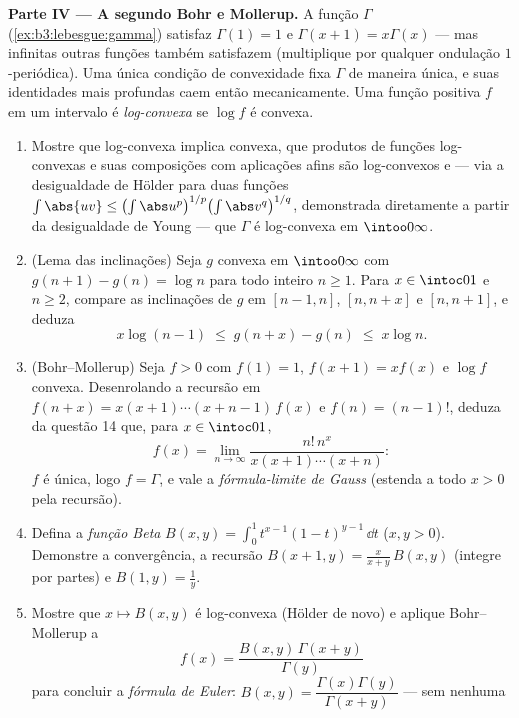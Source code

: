 \begin{problem}
\medskip
\noindent\textbf{Parte IV --- A  segundo Bohr e Mollerup.} A
função $\Gamma$ (\cref{ex:b3:lebesgue:gamma}) satisfaz $\Gamma(1) = 1$ e $\Gamma(x+1) = x\Gamma(x)$ --- mas
infinitas outras funções também satisfazem (multiplique por qualquer
ondulação $1$-periódica). Uma única condição de convexidade fixa
$\Gamma$ de maneira única, e suas identidades mais profundas caem
então mecanicamente. Uma função positiva $f$ em um intervalo é
\emph{log-convexa} se $\log f$ é convexa.
\begin{enumerate}[resume]
  \item Mostre que log-convexa implica convexa, que produtos de funções
        log-convexas e suas composições com aplicações afins são
        log-convexos e --- via a desigualdade de Hölder para duas
        funções $\int\abs{uv} \leq
        \bigl(\int\abs u^p\bigr)^{1/p}\bigl(\int\abs
        v^q\bigr)^{1/q}$, demonstrada diretamente a partir da desigualdade
        de Young --- que $\Gamma$ é log-convexa em $\intoo0\infty$.
  \item (Lema das inclinações) Seja $g$ convexa em $\intoo0\infty$ com $g(n+1) - g(n) = \log n$
        para todo inteiro $n
        \geq 1$. Para $x \in \intoc01$ e $n \geq 2$, compare as
        inclinações de $g$ em $[n-1, n]$, $[n, n+x]$ e $[n, n+1]$, e deduza
        \[
        x\log(n-1) \;\leq\; g(n + x) - g(n) \;\leq\; x\log n .
        \]
  \item (Bohr--Mollerup) Seja $f > 0$ com $f(1) = 1$, $f(x+1) = xf(x)$ e $\log f$
        convexa. Desenrolando a recursão em $f(n + x) = x(x+1)\cdots(x + n -
        1)\,f(x)$ e $f(n) = (n-1)!$, deduza da
        questão 14 que, para $x \in \intoc01$,
        \[
        f(x) = \lim_{n\to\infty}
        \frac{n!\,n^x}{x(x+1)\cdots(x+n)} :
        \]
        $f$ é única, logo $f = \Gamma$, e vale a \emph{fórmula-limite de
        Gauss} (estenda a todo $x > 0$ pela recursão).
  \item Defina a \emph{função Beta} $B(x, y) =
        \int_0^1t^{x-1}(1-t)^{y-1}\,\dd t$ ($x, y > 0$). Demonstre a
        convergência, a recursão $B(x+1, y) =
        \frac{x}{x+y}\,B(x, y)$ (integre por partes) e $B(1, y) = \frac1y$.
  \item Mostre que $x \mapsto B(x, y)$ é log-convexa (Hölder de novo) e aplique
        Bohr--Mollerup a
        \[
        f(x) = \frac{B(x, y)\,\Gamma(x + y)}{\Gamma(y)}
        \]
        para concluir a \emph{fórmula de Euler}: $B(x, y) =
        \dfrac{\Gamma(x)\Gamma(y)}{\Gamma(x+y)}$ --- sem nenhuma

\end{enumerate}
\end{problem}
